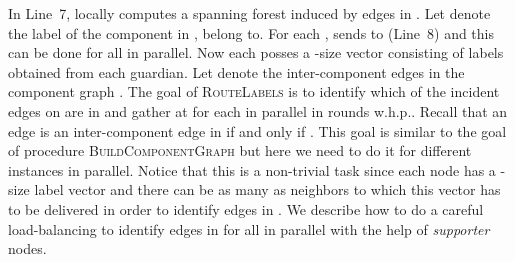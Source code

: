 \documentclass[11pt]{article}
\begin{document}
In Line~7,  locally computes a spanning forest  induced by edges in . 
Let  denote the label of the component in ,  belong to. 
For each ,  sends  to  (Line~8) and this can be done for all  in parallel. 
Now each  posses a -size vector  consisting of labels obtained from each guardian.
Let  denote the inter-component edges in the component graph .
The goal of \textsc{RouteLabels} is to identify which of the incident edges on  are in  and gather  at  for each  in parallel in  rounds w.h.p..   
Recall that an edge  is an inter-component edge in  if and only if . 
This goal is similar to the goal of procedure \textsc{BuildComponentGraph} but here we need to do it for  different instances in parallel. 
Notice that this is a non-trivial task since each node has a -size label vector  and there can be as many as  neighbors to which this vector has to be delivered in order to identify edges in . 
We describe how to do a careful load-balancing to identify edges in  for all  in parallel with the help of \emph{supporter} nodes. 
\end{document}

